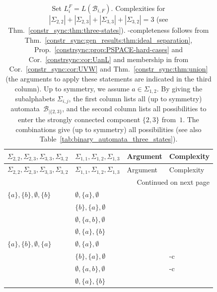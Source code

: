  \label{def:LiFnotation}
\begin{longtable}{l | l | l | l}
	\caption[3-state binary constraint automaton complexities, case $\{2,3\}$]{Set $L_i^F = L(\mathcal B_{i,F})$. 
		Complexities for $|\Sigma_{2,2}| + |\Sigma_{2,3}| + |\Sigma_{3,3}| + |\Sigma_{3,2}| = 3$ (see Thm.~\ref{constr_sync:thm:three-states}). 
		\PSPACE-completeness follows from 
		Thm.~\ref{constr_sync:gen_results:thm:ideal_separation}, Prop.~\ref{constrsync:prop:PSPACE-hard-cases}
		and Cor.~\ref{constrsync:cor:UanL}
		and membership in \NL from Cor.~\ref{constr_sync:cor:UVW} and Thm.~\ref{constr_sync:thm:union}
		(the arguments to apply these statements are indicated in the third column).
		Up to symmetry, we assume $a \in \Sigma_{1,2}$. 
		By giving the subalphabets $\Sigma_{i,j}$, 
		the first column lists all (up to symmetry) automata~$\mathcal B_{|\{2,3\}}$,		 
		and the second column lists all possibilities to enter the strongly connected component $\{2,3\}$
		from~$1$.
		The combinations give (up to symmetry) all possibilities  (see also Table~\ref{tab:binary_automata_three_states}).
	} \label{constr_sync:table:three_states_23} \\
	\toprule
	$\Sigma_{2,2}, \Sigma_{2,3}, \Sigma_{3,3}, \Sigma_{3,2}$ & $\Sigma_{1,1}, \Sigma_{1,2}, \Sigma_{1,3}$ & Argument & Complexity \\
	\hline
	\endfirsthead
	
	\toprule
	$\Sigma_{2,2}, \Sigma_{2,3}, \Sigma_{3,3}, \Sigma_{3,2}$ & $\Sigma_{1,1}, \Sigma_{1,2}, \Sigma_{1,3}$ & Argument & Complexity \\
	\hline
	\endhead
	
	\hline
	\multicolumn{4}{r}{Continued on next page} \\
	\endfoot
	
	\bottomrule
	\endlastfoot
	
	$\{a\},\{b\},\emptyset,\{b\}$ &
	$\emptyset,\{a\},\emptyset$ & {\textXabebXeae} & \NL \\
	& $\{b\},\{a\},\emptyset$ & {\textXabebXbae} & \NL \\
	& $\emptyset,\{a,b\},\emptyset$ & {\textXabebXeabe} & \NL \\
	& $\emptyset,\{a\},\{b\}$ & {\textXabebXeab} & \NL \\
	
	\hline
	
	$\{a\},\{b\},\emptyset,\{a\}$ &
	$\emptyset,\{a\},\emptyset$ & {\textXabeaXeae} & \NL \\
	& $\{b\},\{a\},\emptyset$ & {\textXabeaXbae} & \PSPACE-c \\
	& $\emptyset,\{a,b\},\emptyset$ & {\textXabeaXeabe} & \PSPACE-c \\
	& $\emptyset,\{a\},\{b\}$ & {\textXabeaXeab} & \NL \\
	

\end{longtable}
